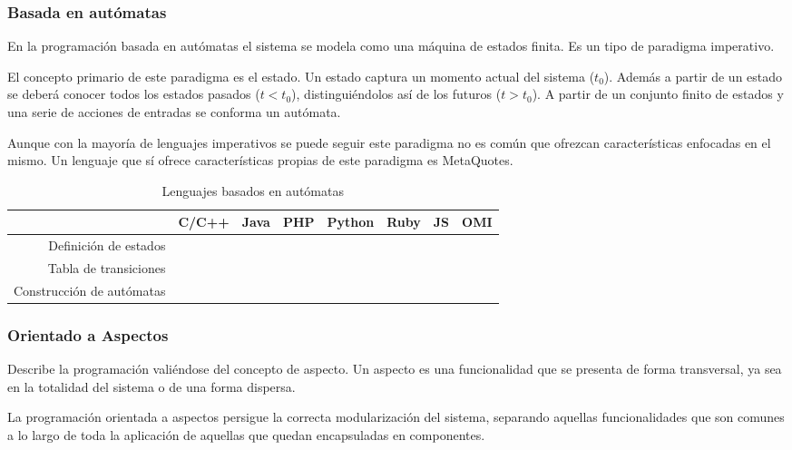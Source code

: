 \subsubsection{Basada en autómatas}
En la programación basada en autómatas el sistema se modela
como una máquina de estados finita. Es un tipo de paradigma imperativo.

El concepto primario de este paradigma es el estado. Un estado captura 
un momento actual del sistema ($t_0$). Además a partir de un estado se 
deberá conocer todos los estados pasados ($t < t_0$), distinguiéndolos 
así de los futuros ($ t > t_0$). A partir de un conjunto finito 
de estados y una serie de acciones de entradas se conforma un 
autómata.

Aunque con la mayoría de lenguajes imperativos se puede seguir este paradigma no es 
común que ofrezcan características enfocadas en el mismo. Un lenguaje que sí ofrece características propias 
de este paradigma es MetaQuotes.

\FloatBarrier
\begin{table}[h]
\begin{center}
 
\begin{tabular}{|r|c|c|c|c|c|c|c|} \hline
 & C/C++ & Java & PHP  & Python & Ruby & JS & OMI\\ \hline
Definición de estados & & & & & &  &  \\ \hline
Tabla de transiciones & & & & & &  &  \\ \hline
Construcción de autómatas & & & & & &  &  \\ \hline
\end{tabular}
\caption{Lenguajes basados en autómatas}
\end{center}
\end{table}
\FloatBarrier

\subsubsection{Orientado a Aspectos}

Describe la programación valiéndose del concepto de aspecto. Un aspecto es una
funcionalidad que se presenta de forma transversal, ya sea en la totalidad 
del sistema o de una forma dispersa. 

La programación orientada a aspectos persigue la correcta modularización del sistema, separando
aquellas funcionalidades que son comunes a lo largo de toda la aplicación de aquellas
que quedan encapsuladas en componentes. 

